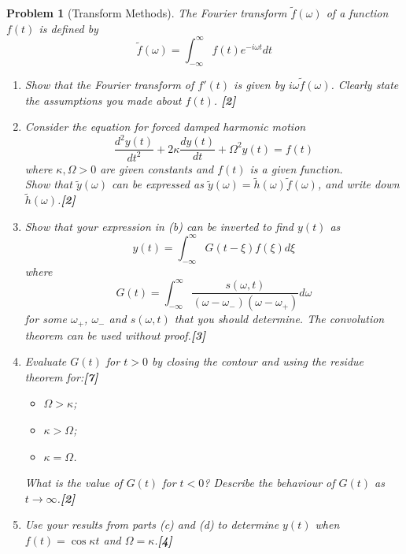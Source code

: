 \documentclass[a4paper]{article}
\theoremstyle{new}
\newtheorem{qns}{Problem}[section]
\begin{document}
\begin{qns}[Transform Methods]
The Fourier transform $\tilde{f}(\omega)$ of a function $f(t)$ is defined by
$$\tilde{f}(\omega)=\int_{-\infty}^\infty f(t)e^{-i\omega t}dt$$
\begin{enumerate}[label=(\alph*)]
\item Show that the Fourier transform of $f'(t)$ is given by $i\omega\tilde{f}(\omega)$. Clearly state the assumptions you made about $f(t)$. \hfill\textbf{[2]}
\item Consider the equation for forced damped harmonic motion
$$\frac{d^2y(t)}{dt^2}+2\kappa\frac{dy(t)}{dt}+\Omega^2y(t)=f(t)$$
where $\kappa,\Omega>0$ are given constants and $f(t)$ is a given function.\\[5pt]
Show that $\tilde{y}(\omega)$ can be expressed as $\tilde{y}(\omega)=\tilde{h}(\omega)\tilde{f}(\omega)$, and write down $\tilde{h}(\omega)$.\hfill\textbf{[2]}
\item Show that your expression in (b) can be inverted to find $y(t)$ as
$$y(t)=\int_{-\infty}^\infty G(t-\xi)f(\xi)d\xi$$
where
$$G(t)=\int_{-\infty}^\infty\frac{s(\omega,t)}{(\omega-\omega_-)(\omega-\omega_+)}d\omega$$
for some $\omega_+$, $\omega_-$ and $s(\omega, t)$ that you should determine. The convolution theorem can be used without proof.\hfill\textbf{[3]}
\item Evaluate $G(t)$ for $t > 0$ by closing the contour and using the residue theorem for:\hfill\textbf{[7]}
\begin{itemize}
    \item $\Omega>\kappa$;
    \item $\kappa>\Omega$;
    \item $\kappa=\Omega$.
\end{itemize}
What is the value of $G(t)$ for $t < 0$? Describe the behaviour of $G(t)$ as $t\rightarrow\infty$.\hfill\textbf{[2]}
\item Use your results from parts (c) and (d) to determine $y(t)$ when $f(t) = \cos\kappa t$ and $\Omega=\kappa$.\hfill\textbf{[4]}
\end{enumerate}
\end{qns}
\end{document}
